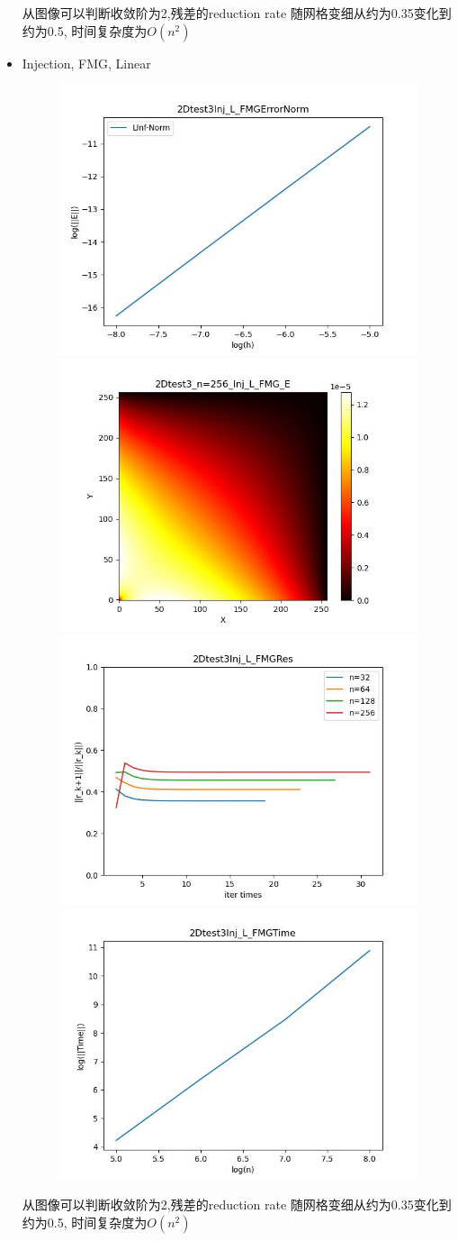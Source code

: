 \documentclass{article}
\begin{document}
\begin{itemize}
    从图像可以判断收敛阶为2,残差的reduction rate 随网格变细从约为0.35变化到约为0.5, 时间复杂度为$O(n^2)$
    \newpage
    \item Injection, FMG, Linear
    \begin{figure}[h]
        \centering
        \includegraphics[width=0.35\linewidth]{2Dtest3Inj_L_FMGErrorNorm.jpg}
        \includegraphics[width=0.35\linewidth]{2Dtest3_n=256_Inj_L_FMG_E.jpg}
        \includegraphics[width=0.35\linewidth]{2Dtest3Inj_L_FMGRes.jpg}
        \includegraphics[width=0.35\linewidth]{2Dtest3Inj_L_FMGTime.jpg}
    \end{figure}
    
    从图像可以判断收敛阶为2,残差的reduction rate 随网格变细从约为0.35变化到约为0.5, 时间复杂度为$O(n^2)$


\end{itemize}
\end{document}
